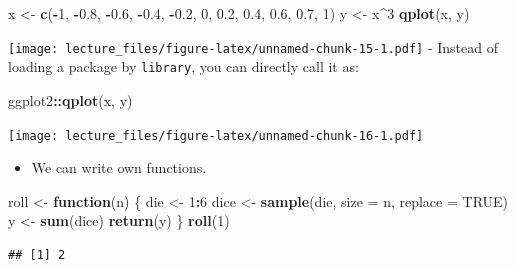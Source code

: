 \documentclass[]{book}
\newenvironment{Shaded}{\begin{snugshade}}{\end{snugshade}}
\newcommand{\KeywordTok}[1]{\textcolor[rgb]{0.13,0.29,0.53}{\textbf{#1}}}
\newcommand{\DataTypeTok}[1]{\textcolor[rgb]{0.13,0.29,0.53}{#1}}
\newcommand{\DecValTok}[1]{\textcolor[rgb]{0.00,0.00,0.81}{#1}}
\newcommand{\FloatTok}[1]{\textcolor[rgb]{0.00,0.00,0.81}{#1}}
\newcommand{\StringTok}[1]{\textcolor[rgb]{0.31,0.60,0.02}{#1}}
\newcommand{\OtherTok}[1]{\textcolor[rgb]{0.56,0.35,0.01}{#1}}
\newcommand{\ControlFlowTok}[1]{\textcolor[rgb]{0.13,0.29,0.53}{\textbf{#1}}}
\newcommand{\OperatorTok}[1]{\textcolor[rgb]{0.81,0.36,0.00}{\textbf{#1}}}
\newcommand{\NormalTok}[1]{#1}
\providecommand{\tightlist}{%
  \setlength{\itemsep}{0pt}\setlength{\parskip}{0pt}}
\begin{document}
\begin{Shaded}
\begin{Highlighting}[]
\NormalTok{x <-}\StringTok{ }\KeywordTok{c}\NormalTok{(}\OperatorTok{-}\DecValTok{1}\NormalTok{, }\OperatorTok{-}\FloatTok{0.8}\NormalTok{, }\OperatorTok{-}\FloatTok{0.6}\NormalTok{, }\OperatorTok{-}\FloatTok{0.4}\NormalTok{, }\OperatorTok{-}\FloatTok{0.2}\NormalTok{, }\DecValTok{0}\NormalTok{, }\FloatTok{0.2}\NormalTok{, }\FloatTok{0.4}\NormalTok{, }\FloatTok{0.6}\NormalTok{, }\FloatTok{0.7}\NormalTok{, }\DecValTok{1}\NormalTok{)}
\NormalTok{y <-}\StringTok{ }\NormalTok{x}\OperatorTok{^}\DecValTok{3}
\KeywordTok{qplot}\NormalTok{(x, y)}
\end{Highlighting}
\end{Shaded}

\texttt{[image: lecture\_files/figure-latex/unnamed-chunk-15-1.pdf]} -
Instead of loading a package by \texttt{library}, you can directly call
it as:

\begin{Shaded}
\begin{Highlighting}[]
\NormalTok{ggplot2}\OperatorTok{::}\KeywordTok{qplot}\NormalTok{(x, y)}
\end{Highlighting}
\end{Shaded}

\texttt{[image: lecture\_files/figure-latex/unnamed-chunk-16-1.pdf]}

\begin{itemize}
\tightlist
\item
  We can write own functions.
\end{itemize}

\begin{Shaded}
\begin{Highlighting}[]
\NormalTok{roll <-}\StringTok{ }\ControlFlowTok{function}\NormalTok{(n) \{}
\NormalTok{  die <-}\StringTok{ }\DecValTok{1}\OperatorTok{:}\DecValTok{6}
\NormalTok{  dice <-}\StringTok{ }\KeywordTok{sample}\NormalTok{(die, }\DataTypeTok{size =}\NormalTok{ n, }\DataTypeTok{replace =} \OtherTok{TRUE}\NormalTok{)}
\NormalTok{  y <-}\StringTok{ }\KeywordTok{sum}\NormalTok{(dice)}
  \KeywordTok{return}\NormalTok{(y)}
\NormalTok{\}}
\KeywordTok{roll}\NormalTok{(}\DecValTok{1}\NormalTok{)}
\end{Highlighting}
\end{Shaded}

\begin{verbatim}
## [1] 2
\end{verbatim}
\end{document}
